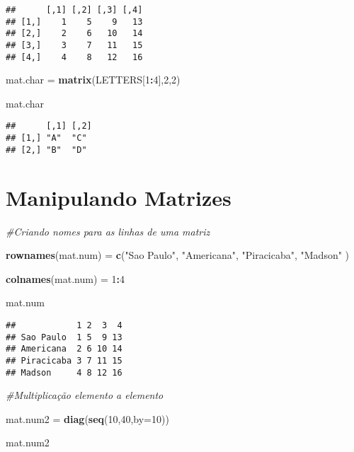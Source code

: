 \documentclass[]{article}
\newenvironment{Shaded}{\begin{snugshade}}{\end{snugshade}}
\newcommand{\KeywordTok}[1]{\textcolor[rgb]{0.13,0.29,0.53}{\textbf{#1}}}
\newcommand{\DataTypeTok}[1]{\textcolor[rgb]{0.13,0.29,0.53}{#1}}
\newcommand{\DecValTok}[1]{\textcolor[rgb]{0.00,0.00,0.81}{#1}}
\newcommand{\StringTok}[1]{\textcolor[rgb]{0.31,0.60,0.02}{#1}}
\newcommand{\CommentTok}[1]{\textcolor[rgb]{0.56,0.35,0.01}{\textit{#1}}}
\newcommand{\OperatorTok}[1]{\textcolor[rgb]{0.81,0.36,0.00}{\textbf{#1}}}
\newcommand{\NormalTok}[1]{#1}
\begin{document}
\begin{verbatim}
##      [,1] [,2] [,3] [,4]
## [1,]    1    5    9   13
## [2,]    2    6   10   14
## [3,]    3    7   11   15
## [4,]    4    8   12   16
\end{verbatim}

\begin{Shaded}
\begin{Highlighting}[]
\NormalTok{mat.char =}\StringTok{ }\KeywordTok{matrix}\NormalTok{(LETTERS[}\DecValTok{1}\OperatorTok{:}\DecValTok{4}\NormalTok{],}\DecValTok{2}\NormalTok{,}\DecValTok{2}\NormalTok{)}

\NormalTok{mat.char}
\end{Highlighting}
\end{Shaded}

\begin{verbatim}
##      [,1] [,2]
## [1,] "A"  "C" 
## [2,] "B"  "D"
\end{verbatim}

\section{Manipulando Matrizes}\label{manipulando-matrizes}

\begin{Shaded}
\begin{Highlighting}[]
\CommentTok{#Criando nomes para as linhas de uma matriz}

\KeywordTok{rownames}\NormalTok{(mat.num) =}\StringTok{ }\KeywordTok{c}\NormalTok{(}\StringTok{"Sao Paulo"}\NormalTok{, }\StringTok{"Americana"}\NormalTok{, }\StringTok{"Piracicaba"}\NormalTok{, }\StringTok{"Madson"}\NormalTok{ )}

\KeywordTok{colnames}\NormalTok{(mat.num) =}\StringTok{ }\DecValTok{1}\OperatorTok{:}\DecValTok{4}

\NormalTok{mat.num}
\end{Highlighting}
\end{Shaded}

\begin{verbatim}
##            1 2  3  4
## Sao Paulo  1 5  9 13
## Americana  2 6 10 14
## Piracicaba 3 7 11 15
## Madson     4 8 12 16
\end{verbatim}

\begin{Shaded}
\begin{Highlighting}[]
\CommentTok{#Multiplicação elemento a elemento}

\NormalTok{mat.num2 =}\StringTok{ }\KeywordTok{diag}\NormalTok{(}\KeywordTok{seq}\NormalTok{(}\DecValTok{10}\NormalTok{,}\DecValTok{40}\NormalTok{,}\DataTypeTok{by=}\DecValTok{10}\NormalTok{))}

\NormalTok{mat.num2}
\end{Highlighting}
\end{Shaded}
\end{document}
